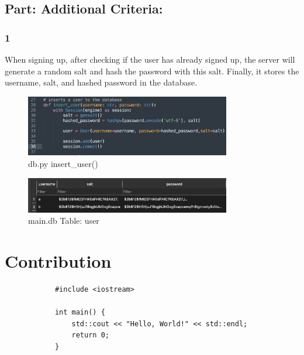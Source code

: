 \documentclass[12pt]{article}
\begin{document}
    \subsection*{Part: Additional Criteria:}

        \subsubsection*{1} When signing up, after checking if the user has already signed up, the server will generate a random salt and hash the password with this salt. Finally, it stores the username, salt, and hashed password in the database.

        \begin{figure}[H]
            \centering
            \includegraphics[width=0.8\textwidth]{graphs/insert_user.jpg}
            \caption{db.py insert\_user()}
        \end{figure}

        \begin{figure}[H]
            \centering
            \includegraphics[width=0.8\textwidth]{graphs/hashed_passwd.jpg}
            \caption{main.db Table: user}
        \end{figure}



\section{Contribution}

        \begin{verbatim}
            #include <iostream>

            int main() {
                std::cout << "Hello, World!" << std::endl;
                return 0;
            }
        \end{verbatim}
\end{document}
